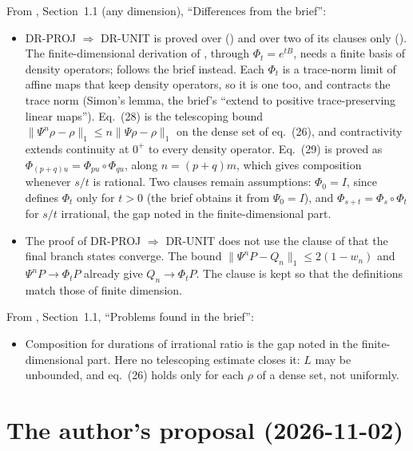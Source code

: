 \documentclass[11pt]{article}
\begin{document}
\noindent
From , Section~1.1 (any dimension), ``Differences from the brief'':
\begin{itemize}
\item DR-PROJ $\Rightarrow$ DR-UNIT is proved over  () and
  over two of its clauses only (). The
  finite-dimensional derivation of , through $\Phi_t = e^{tB}$, needs a finite
  basis of density operators;  follows the brief instead.
  Each $\Phi_t$ is a trace-norm limit of affine maps that keep density operators, so it is one
  too, and contracts the trace norm (Simon's lemma, the brief's ``extend to positive
  trace-preserving linear maps''). Eq.~(28) is the telescoping bound
  $\|\Psi^n\rho - \rho\|_1 \le n\|\Psi\rho - \rho\|_1$ on the dense set of eq.~(26), and
  contractivity extends continuity at $0^+$ to every density operator. Eq.~(29) is proved as
  $\Phi_{(p+q)u} = \Phi_{pu}\circ\Phi_{qu}$, along $n = (p+q)m$, which gives composition whenever
  $s/t$ is rational. Two clauses remain assumptions: $\Phi_0 = I$, since 
  defines $\Phi_t$ only for $t > 0$ (the brief obtains it from $\Psi_0 = I$), and
  $\Phi_{s+t} = \Phi_s\circ\Phi_t$ for $s/t$ irrational, the gap noted in the finite-dimensional
  part.
\item The proof of DR-PROJ $\Rightarrow$ DR-UNIT does not use the clause of
   that the final branch states converge. The bound
  $\|\Psi^nP - Q_n\|_1 \le 2(1-w_n)$ and $\Psi^nP \to \Phi_tP$ already give $Q_n \to \Phi_tP$.
  The clause is kept so that the definitions match those of finite dimension.
\end{itemize}

\noindent
From , Section~1.1, ``Problems found in the brief'':
\begin{itemize}
\item Composition for durations of irrational ratio is the gap noted in the finite-dimensional
  part. Here no telescoping estimate closes it: $L$ may be unbounded, and eq.~(26) holds only
  for each $\rho$ of a dense set, not uniformly.
\end{itemize}

\section{The author's proposal (2026-11-02)}
\end{document}

